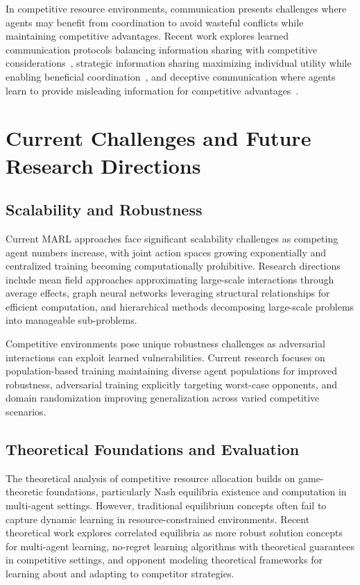 In competitive resource environments, communication presents challenges where agents may benefit from coordination to avoid wasteful conflicts while maintaining competitive advantages. Recent work explores learned communication protocols balancing information sharing with competitive considerations~\autocite{foerster_learning_2016}, strategic information sharing maximizing individual utility while enabling beneficial coordination~\autocite{eccles_biases_2019}, and deceptive communication where agents learn to provide misleading information for competitive advantages~\autocite{cao_emergent_2018}.

\section{Current Challenges and Future Research Directions}

\subsection{Scalability and Robustness}

Current MARL approaches face significant scalability challenges as competing agent numbers increase, with joint action spaces growing exponentially and centralized training becoming computationally prohibitive. Research directions include mean field approaches approximating large-scale interactions through average effects, graph neural networks leveraging structural relationships for efficient computation, and hierarchical methods decomposing large-scale problems into manageable sub-problems.

Competitive environments pose unique robustness challenges as adversarial interactions can exploit learned vulnerabilities. Current research focuses on population-based training maintaining diverse agent populations for improved robustness, adversarial training explicitly targeting worst-case opponents, and domain randomization improving generalization across varied competitive scenarios.

\subsection{Theoretical Foundations and Evaluation}

The theoretical analysis of competitive resource allocation builds on game-theoretic foundations, particularly Nash equilibria existence and computation in multi-agent settings. However, traditional equilibrium concepts often fail to capture dynamic learning in resource-constrained environments. Recent theoretical work explores correlated equilibria as more robust solution concepts for multi-agent learning, no-regret learning algorithms with theoretical guarantees in competitive settings, and opponent modeling theoretical frameworks for learning about and adapting to competitor strategies.

